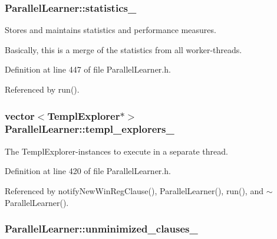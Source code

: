 \hypertarget{classParallelLearner_abfb2e28ec1a0f8775d3f14f75415a8bd}{
\subsubsection[{statistics\-\_\-}]{ Parallel\-Learner\-::statistics\-\_\-\hspace{0.3cm}{\ttfamily [protected]}}}\label{classParallelLearner_abfb2e28ec1a0f8775d3f14f75415a8bd}


Stores and maintains statistics and performance measures. 

Basically, this is a merge of the statistics from all worker-\/threads. 

Definition at line 447 of file Parallel\-Learner.\-h.



Referenced by run().

\hypertarget{classParallelLearner_af25fc31c964c9157459041eb6eb229cd}{
\subsubsection[{templ\-\_\-explorers\-\_\-}]{\setlength{\rightskip}{0pt plus 5cm}vector$<${\bf Templ\-Explorer}$\ast$$>$ Parallel\-Learner\-::templ\-\_\-explorers\-\_\-\hspace{0.3cm}{\ttfamily [protected]}}}\label{classParallelLearner_af25fc31c964c9157459041eb6eb229cd}


The Templ\-Explorer-\/instances to execute in a separate thread. 



Definition at line 420 of file Parallel\-Learner.\-h.



Referenced by notify\-New\-Win\-Reg\-Clause(), Parallel\-Learner(), run(), and $\sim$\-Parallel\-Learner().

\hypertarget{classParallelLearner_aba6b363071d9a39d7b368cec5b629c25}{
\subsubsection[{unminimized\-\_\-clauses\-\_\-}]{ Parallel\-Learner\-::unminimized\-\_\-clauses\-\_\-}}\label{classParallelLearner_aba6b363071d9a39d7b368cec5b629c25}


